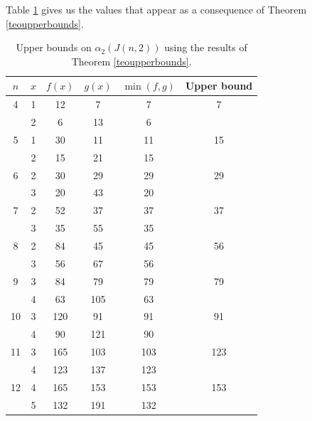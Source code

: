 \documentclass{article}
\newcommand{\red}[1]{\textcolor{red}{#1}}
\begin{document}
Table \ref{tab:betterupper-bounds} gives us the values that appear as a consequence of Theorem \ref{teoupperbounds}.

\begin{table}[t]
\centering
\begin{tabular}{|c|c|c|c|c|c|}
\hline
$n$ & $x$ & $f(x)$ & $g(x)$ & $\min(f,g)$ & Upper bound \\
\hline
4 & 1 & 12 & 7 & 7 & 7\\
& 2 & 6 & 13 & 6 &  \\
\hline
5 & 1 & 30 & 11 & 11 & 15 \\
& 2 & 15 & 21 & 15 & \\
\hline
6 & 2 & 30 & 29 & 29 & 29 \\
& 3 & 20 & 43 & 20 & \\
\hline
7 & 2 & 52  & 37  & 37   &  37 \\
& 3 & 35  & 55  & 35   &  \\
\hline
8 & 2 & 84  & 45   & 45   & 56 \\
 & 3 & 56  & 67   & 56   &  \\
\hline 
9 & 3 & 84 & 79 & 79 & 79 \\
& 4 & 63 & 105 &63 & \\
\hline
10 & 3 & 120 & 91 & 91 & 91 \\
& 4 & 90 & 121 &90 & \\
\hline
11 & 3 & 165 & 103 & 103 & 123 \\
& 4 & 123 & 137 & 123 &  \\
\hline
12  & 4 & 165 & 153 & 153 & 153 \\
& 5 & 132 & 191 & 132 &  \\
\hline
\end{tabular}
\caption{Upper bounds on $\alpha_2(J(n,2))$ using the results of Theorem \ref{teoupperbounds}. %
}
\label{tab:betterupper-bounds}
\end{table}
\end{document}
